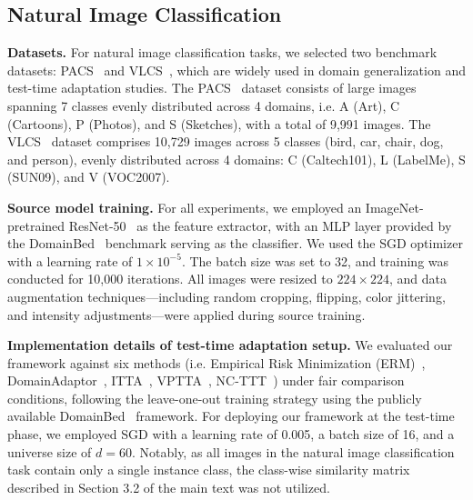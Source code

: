 \subsection{Natural Image Classification}
\noindent \textbf{Datasets.} For natural image classification tasks, we selected two benchmark datasets: PACS~\cite{li2017deeper} and VLCS~\cite{fang2013unbiased}, which are widely used in domain generalization and test-time adaptation studies. 
The PACS~\cite{li2017deeper} dataset consists of large images spanning 7 classes evenly distributed across 4 domains, i.e. A (Art), C (Cartoons), P (Photos), and S (Sketches), with a total of 9,991 images. 
The VLCS~\cite{fang2013unbiased} dataset comprises 10,729 images across 5 classes (bird, car, chair, dog, and person), evenly distributed across 4 domains: C (Caltech101), L (LabelMe), S (SUN09), and V (VOC2007).

\noindent \textbf{Source model training.} For all experiments, we employed an ImageNet-pretrained ResNet-50~\cite{he2016deep} as the feature extractor, with an MLP layer provided by the DomainBed~\cite{gulrajanisearch} benchmark serving as the classifier. We used the SGD optimizer with a learning rate of $1 \times 10^{-5}$. The batch size was set to 32, and training was conducted for 10,000 iterations. All images were resized to $224 \times 224$, and data augmentation techniques—including random cropping, flipping, color jittering, and intensity adjustments—were applied during source training.

\noindent \textbf{Implementation details of test-time adaptation setup.} We evaluated our framework against six methods (i.e. Empirical Risk Minimization (ERM)~\cite{vapnik1998statistical}, DomainAdaptor~\cite{zhang2023domainadaptor}, ITTA~\cite{chen2023improved}, VPTTA~\cite{chen2024each}, NC-TTT~\cite{osowiechi2024nc}) under fair comparison conditions, following the leave-one-out training strategy using the publicly available DomainBed~\cite{gulrajanisearch} framework. For deploying our framework at the test-time phase, we employed SGD with a learning rate of 0.005, a batch size of 16, and a universe size of $d = 60$. Notably, as all images in the natural image classification task contain only a single instance class, the class-wise similarity matrix described in Section 3.2 of the main text was not utilized.

